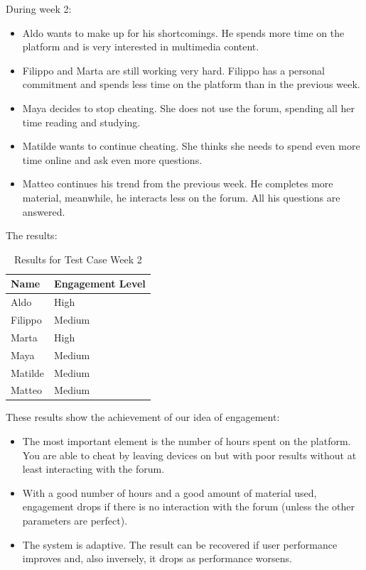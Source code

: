 During week 2:
\begin{itemize}
    \item Aldo wants to make up for his shortcomings. He spends more time on the platform and is very 
    interested in multimedia content.
    \item Filippo and Marta are still working very hard. Filippo has a personal commitment and spends 
    less time on the platform than in the previous week.
    \item Maya decides to stop cheating. She does not use the forum, spending all her time reading and 
    studying.
    \item Matilde wants to continue cheating. She thinks she needs to spend even more time online and 
    ask even more questions.
    \item Matteo continues his trend from the previous week. He completes more material, meanwhile,
    he interacts less on the forum. All his questions are answered.
\end{itemize}

The results:\\
\vspace{1em}
\begin{table}[H]
\centering
\begin{tabular}{l l}
\toprule
Name     & Engagement Level \\
\midrule
Aldo     & High \\
Filippo  & Medium \\
Marta    & High \\
Maya     & Medium \\
Matilde  & Medium \\
Matteo   & Medium \\
\bottomrule
\end{tabular}
\caption{Results for Test Case Week 2}
\end{table}
\vspace{1em}

These results show the achievement of our idea of engagement:
\begin{itemize}
    \item The most important element is the number of hours spent on the platform. You are able to 
    cheat by leaving devices on but with poor results without at least interacting with the forum.
    \item With a good number of hours and a good amount of material used, engagement drops if there 
    is no interaction with the forum (unless the other parameters are perfect).
    \item The system is adaptive. The result can be recovered if user performance improves and, 
    also inversely, it drops as performance worsens.
\end{itemize}

